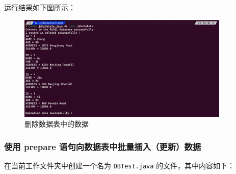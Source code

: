 \documentclass{article}
\renewcommand\tt{\texttt}
\begin{document}
运行结果如下图所示：

\begin{figure}[H]
  \centering
  \includegraphics[width=0.9\textwidth]{img/10.png}
  \caption{删除数据表中的数据}
\end{figure}

\subsubsection{使用 prepare 语句向数据表中批量插入（更新）数据}

在当前工作文件夹中创建一个名为 \tt{DBTest.java} 的文件，其中内容如下：
\end{document}
